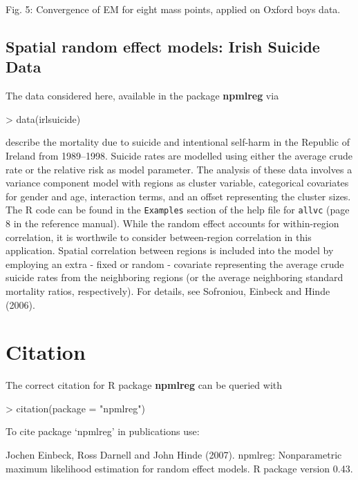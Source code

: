 \documentclass[a4paper]{article}
\begin{document}
\begin{landscape}
\begin{minipage}{21cm}
 Fig. 5: Convergence of EM for eight mass points, applied on Oxford boys data. 
 \end{minipage}
 
 
 
 
 \subsection{Spatial random effect models: Irish Suicide Data}
 
 
 The data considered here, available in the package {\bf npmlreg} via
\begin{Schunk}
\begin{Sinput}
> data(irlsuicide)
\end{Sinput}
\end{Schunk}
 describe the mortality due to suicide and intentional self-harm in the Republic of Ireland from 1989--1998.  
 Suicide rates are modelled using 
either the average crude rate or the relative risk as model parameter. The analysis of these data involves  a variance component model 
with regions as cluster variable, categorical covariates for gender and age, interaction terms, 
  and an offset representing the cluster sizes. The R code can be found in the {\tt Examples} section of the help file for {\tt allvc} (page 8 in the reference manual). 
While the random effect accounts for within-region correlation, it is worthwile to consider between-region correlation in this application.
Spatial correlation between regions is included 
 into the model by employing  an extra - fixed or random - covariate representing the average crude 
 suicide rates from the neighboring regions (or the average neighboring 
 standard mortality ratios, respectively). For details, see Sofroniou, Einbeck and Hinde (2006).
 
 
 \section{Citation}

The correct citation for R package {\bf npmlreg} can be queried with
\begin{Schunk}
\begin{Sinput}
> citation(package = "npmlreg")
\end{Sinput}
\begin{Soutput}
To cite package ‘npmlreg’ in publications use:

  Jochen Einbeck, Ross Darnell and John Hinde (2007). npmlreg:
  Nonparametric maximum likelihood estimation for random effect models.
  R package version 0.43.


\end{Soutput}
\end{Schunk}
\end{landscape}
\end{document}
